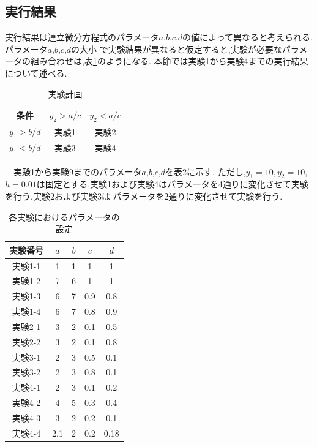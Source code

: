 \documentclass[a4j]{jarticle}
\begin{document}
      \subsection{実行結果}
      実行結果は連立微分方程式のパラメータ$a$,$b$,$c$,$d$の値によって異なると考えられる.パラメータ$a$,$b$,$c$,$d$の大小
      で実験結果が異なると仮定すると,実験が必要なパラメータの組み合わせは,表\ref{result1-plan}のようになる.
      本節では実験1から実験4までの実行結果について述べる.
      \begin{table}[H]
        \caption{実験計画}
      \label{result1-plan}
      \begin{center}
          \begin{tabular}{c|c|c}\hline
            条件 & $y_2 > a/c$ & $y_2 < a/c$\\ \hline
            $y_1 > b/d$  & 実験1 & 実験2  \\
            $y_1 < b/d$  & 実験3 & 実験4 \\ \hline
          \end{tabular}
      \end{center}
      \end{table}

      　実験1から実験9までのパラメータ$a$,$b$,$c$,$d$を表\ref{result1-params}に示す.
      ただし,$y_1=10,y_2=10$,$h=0.01$は固定とする.実験1および実験4はパラメータを4通りに変化させて実験を行う.実験2および実験3は
      パラメータを2通りに変化させて実験を行う.
      \begin{table}[H]
        \caption{各実験におけるパラメータの設定}
      \label{result1-params}
      \begin{center}
          \begin{tabular}{c|c|c|c|c}\hline
            実験番号 & $a$ & $b$ & $c$ & $d$ \\ \hline \hline
            実験1-1 & 1 & 1 & 1 & 1 \\ \hline
            実験1-2 & 7 & 6 & 1 & 1 \\ \hline
            実験1-3 & 6 & 7 & 0.9 & 0.8 \\ \hline
            実験1-4 & 6 & 7 & 0.8 & 0.9 \\ \hline
            実験2-1 & 3 & 2 & 0.1 & 0.5 \\ \hline
            実験2-2 & 3 & 2 & 0.1 & 0.8 \\ \hline
            実験3-1 & 2 & 3 & 0.5 & 0.1 \\ \hline
            実験3-2 & 2 & 3 & 0.8 & 0.1 \\ \hline
            実験4-1 & 2 & 3 & 0.1 & 0.2 \\ \hline
            実験4-2 & 4 & 5 & 0.3 & 0.4 \\ \hline
            実験4-3 & 3 & 2 & 0.2 & 0.1 \\ \hline
            実験4-4 & 2.1 & 2 & 0.2 & 0.18 \\ \hline
          \end{tabular}
      \end{center}
      \end{table}
\end{document}
